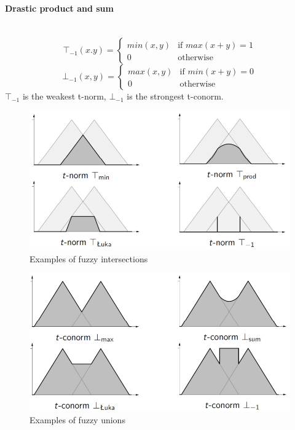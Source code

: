 \documentclass{article}
\begin{document}
\paragraph{Drastic product and sum}\mbox{}\\
\[
    \top_{-1}(x.y)=
    \begin{cases}
        min(x,y) & \text{if } max(x+y)=1 \\
        0        & \text{otherwise}
    \end{cases}
\]
\[
    \bot_{-1}(x,y)=
    \begin{cases}
        max(x,y) & \text{if } min(x+y)=0 \\
        0        & \text{otherwise}
    \end{cases}
\]
$\top_{-1}$ is the weakest t-norm, $\bot_{-1}$ is the strongest t-conorm.

\begin{figure}[h]
    \centering
    \includegraphics[scale=0.4]{images/fuzzy_interesectiosnb.png}
    \caption{Examples of fuzzy intersections}
\end{figure}

\begin{figure}[H]
    \centering
    \includegraphics[scale=0.4]{images/fuzzy_unions.png}
    \caption{Examples of fuzzy unions}
\end{figure}
\end{document}
